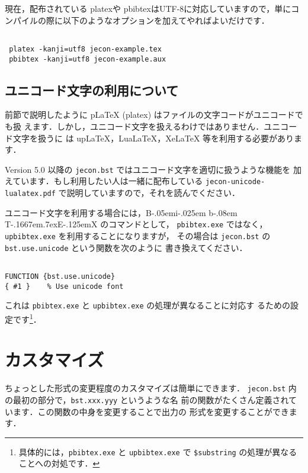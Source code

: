 \documentclass[a4j,10pt]{jarticle}
\def\BibTeX{{\rm B\kern-.05em{\sc i\kern-.025em b}\kern-.08em
    T\kern-.1667em\lower.7ex\hbox{E}\kern-.125emX}}
\begin{document}
現在，配布されている platexや pbibtexはUTF-8に対応していますので，単にコ
ンパイルの際に以下のようなオプションを加えてやればよいだけです．
\begin{screen}
 \begin{verbatim}

 platex -kanji=utf8 jecon-example.tex
 pbibtex -kanji=utf8 jecon-example.aux
 \end{verbatim}
\end{screen}

\subsection{ユニコード文字の利用について}

前節で説明したように p\LaTeX{} (platex) はファイルの文字コードがユニコードでも扱
えます．しかし，ユニコード文字を扱えるわけではありません．ユニコード文字を扱うに
は upLaTeX，LuaLaTeX，XeLaTeX 等を利用する必要があります．

Version 5.0 以降の \texttt{jecon.bst} ではユニコード文字を適切に扱うような機能を
加えています．もし利用したい人は一緒に配布している
\texttt{jecon-unicode-lualatex.pdf} で説明していますので，それを読んでください．
\vspace*{1em}

ユニコード文字を利用する場合には，\BibTeX{} のコマンドとして，
\texttt{pbibtex.exe} ではなく，\texttt{upbibtex.exe} を利用することになりますが，
その場合は \texttt{jecon.bst} の \texttt{bst.use.unicode} という関数を次のように
書き換えてください．
\begin{screen}
 \begin{verbatim}

FUNCTION {bst.use.unicode}
{ #1 }    % Use unicode font
 \end{verbatim}
\end{screen}

これは \texttt{pbibtex.exe} と \texttt{upbibtex.exe} の処理が異なることに対応す
るための設定です\footnote{具体的には，\texttt{pbibtex.exe} と
\texttt{upbibtex.exe} で \texttt{\$substring} の処理が異なることへの対処です．}．


\section{カスタマイズ}

ちょっとした形式の変更程度のカスタマイズは簡単にできます．
\texttt{jecon.bst} 内の最初の部分で，\texttt{bst.xxx.yyy} というような名
前の関数がたくさん定義されています．この関数の中身を変更することで出力の
形式を変更することができます．
\end{document}
